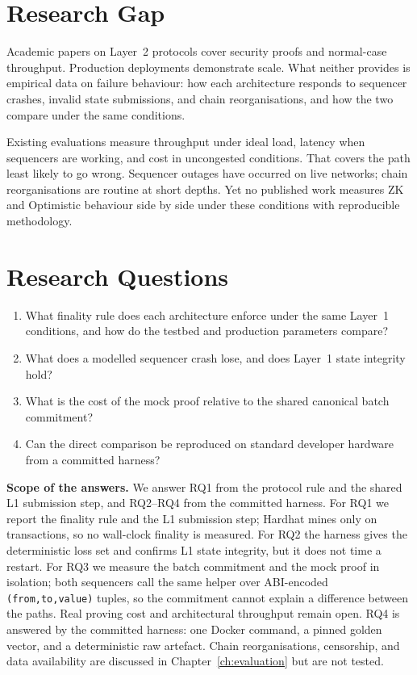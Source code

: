 \section{Research Gap}

Academic papers on Layer~2 protocols cover security proofs and normal-case throughput. Production deployments demonstrate scale. What neither provides is empirical data on failure behaviour: how each architecture responds to sequencer crashes, invalid state submissions, and chain reorganisations, and how the two compare under the same conditions.

Existing evaluations measure throughput under ideal load, latency when sequencers are working, and cost in uncongested conditions. That covers the path least likely to go wrong. Sequencer outages have occurred on live networks; chain reorganisations are routine at short depths. Yet no published work measures ZK and Optimistic behaviour side by side under these conditions with reproducible methodology.

\section{Research Questions}

\begin{enumerate}
    \item What finality rule does each architecture enforce under the same Layer~1 conditions, and how do the testbed and production parameters compare?
    \item What does a modelled sequencer crash lose, and does Layer~1 state integrity hold?
    \item What is the cost of the mock proof relative to the shared canonical batch commitment?
    \item Can the direct comparison be reproduced on standard developer hardware from a committed harness?
\end{enumerate}

\textbf{Scope of the answers.} We answer RQ1 from the protocol rule and the shared L1 submission step, and RQ2--RQ4 from the committed harness. For RQ1 we report the finality rule and the L1 submission step; Hardhat mines only on transactions, so no wall-clock finality is measured. For RQ2 the harness gives the deterministic loss set and confirms L1 state integrity, but it does not time a restart. For RQ3 we measure the batch commitment and the mock proof in isolation; both sequencers call the same helper over ABI-encoded \texttt{(from,to,value)} tuples, so the commitment cannot explain a difference between the paths. Real proving cost and architectural throughput remain open. RQ4 is answered by the committed harness: one Docker command, a pinned golden vector, and a deterministic raw artefact. Chain reorganisations, censorship, and data availability are discussed in Chapter~\ref{ch:evaluation} but are not tested.

